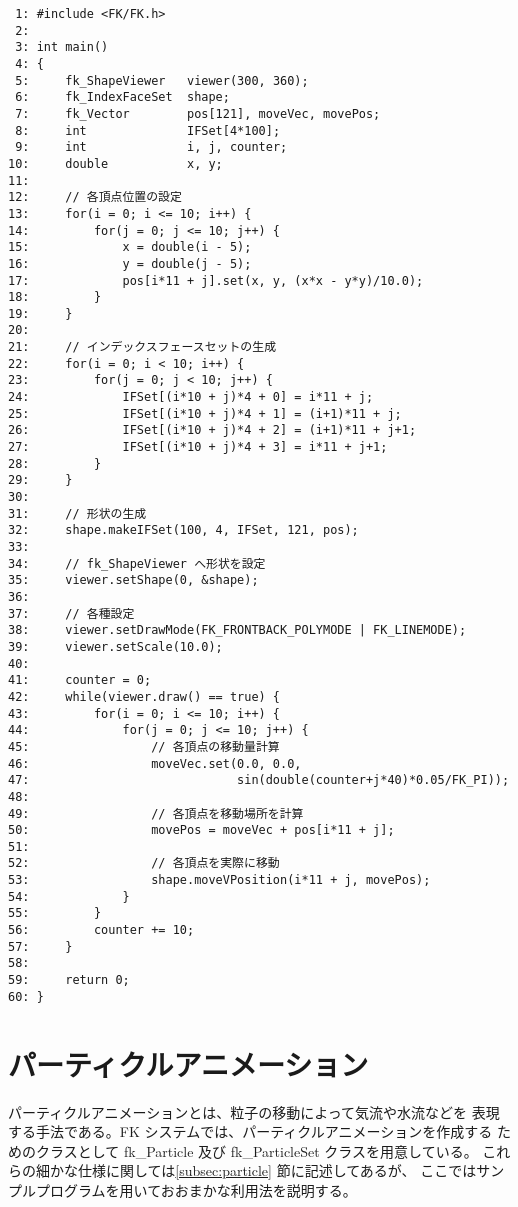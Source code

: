 \begin{breakbox}
\begin{verbatim}
 1: #include <FK/FK.h>
 2: 
 3: int main()
 4: {
 5:     fk_ShapeViewer   viewer(300, 360);
 6:     fk_IndexFaceSet  shape;
 7:     fk_Vector        pos[121], moveVec, movePos;
 8:     int              IFSet[4*100];
 9:     int              i, j, counter;
10:     double           x, y;
11: 
12:     // 各頂点位置の設定
13:     for(i = 0; i <= 10; i++) {
14:         for(j = 0; j <= 10; j++) {
15:             x = double(i - 5);    
16:             y = double(j - 5);
17:             pos[i*11 + j].set(x, y, (x*x - y*y)/10.0);
18:         }
19:     }
20: 
21:     // インデックスフェースセットの生成
22:     for(i = 0; i < 10; i++) {
23:         for(j = 0; j < 10; j++) {
24:             IFSet[(i*10 + j)*4 + 0] = i*11 + j;
25:             IFSet[(i*10 + j)*4 + 1] = (i+1)*11 + j;
26:             IFSet[(i*10 + j)*4 + 2] = (i+1)*11 + j+1;
27:             IFSet[(i*10 + j)*4 + 3] = i*11 + j+1;
28:         }
29:     }
30: 
31:     // 形状の生成
32:     shape.makeIFSet(100, 4, IFSet, 121, pos);
33: 
34:     // fk_ShapeViewer へ形状を設定
35:     viewer.setShape(0, &shape);
36: 
37:     // 各種設定
38:     viewer.setDrawMode(FK_FRONTBACK_POLYMODE | FK_LINEMODE);
39:     viewer.setScale(10.0);
40: 
41:     counter = 0;
42:     while(viewer.draw() == true) {
43:         for(i = 0; i <= 10; i++) {
44:             for(j = 0; j <= 10; j++) {
45:                 // 各頂点の移動量計算
46:                 moveVec.set(0.0, 0.0,
47:                             sin(double(counter+j*40)*0.05/FK_PI));
48: 
49:                 // 各頂点を移動場所を計算
50:                 movePos = moveVec + pos[i*11 + j];
51: 
52:                 // 各頂点を実際に移動
53:                 shape.moveVPosition(i*11 + j, movePos);
54:             }
55:         }
56:         counter += 10;
57:     }
58: 
59:     return 0;
60: }
\end{verbatim}
\end{breakbox}
\section{パーティクルアニメーション}
パーティクルアニメーションとは、粒子の移動によって気流や水流などを
表現する手法である。FK システムでは、パーティクルアニメーションを作成する
ためのクラスとして fk\_Particle 及び fk\_ParticleSet クラスを用意している。
これらの細かな仕様に関しては\ref{subsec:particle} 節に記述してあるが、
ここではサンプルプログラムを用いておおまかな利用法を説明する。

